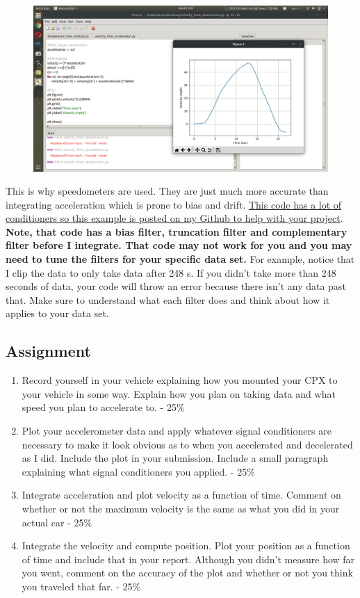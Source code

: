 \begin{figure}[H]
  \begin{center}
    \includegraphics[width=\textwidth]{Figures/accelerometer_integration.png}
  \end{center}
\end{figure}
This is why speedometers are used. They are just much more accurate than integrating acceleration which is prone to bias and drift. \href{https://github.com/cmontalvo251/Python/blob/master/instrumentation/cpx_assignments/velocity_from_acceleration.py}{This code has a lot of conditioners so this example is posted on my Github to help with your project}. {\bf Note, that code has a bias filter, truncation filter and complementary filter before I integrate. That code may not work for you and you may need to tune the filters for your specific data set.} For example, notice that I clip the data to only take data after 248 s. If you didn't take more than 248 seconds of data, your code will throw an error because there isn't any data past that. Make sure to understand what each filter does and think about how it applies to your data set.

\subsection{Assignment}



\begin{enumerate}[itemsep=-5pt]
\item Record yourself in your vehicle explaining how you mounted your CPX to your vehicle in some way. Explain how you plan on taking data and what speed you plan to accelerate to. - 25\%
\item Plot your accelerometer data and apply whatever signal conditioners are necessary to make it look obvious as to when you accelerated and decelerated as I did. Include the plot in your submission. Include a small paragraph explaining what signal conditioners you applied. - 25\%
\item Integrate acceleration and plot velocity as a function of time. Comment on whether or not the maximum velocity is the same as what you did in your actual car - 25\%
\item Integrate the velocity and compute position. Plot your position as a function of time and include that in your report. Although you didn't measure how far you went, comment on the accuracy of the plot and whether or not you think you traveled that far. - 25\%
\end{enumerate}
